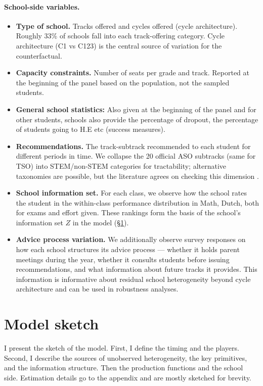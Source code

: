 \documentclass{article}
\begin{document}
\paragraph{School-side variables.}
\begin{itemize}
  \item \textbf{Type of school.} Tracks offered and cycles offered (cycle architecture). Roughly 33\% of schools fall into each track-offering category. Cycle architecture (C1 vs C123) is the central source of variation for the counterfactual.
  \item \textbf{Capacity constraints.} Number of seats per grade and track. Reported at the beginning of the panel based on the population, not the sampled students.
  \item \textbf{General school statistics:} Also given at the beginning of the panel and for other students, schools also provide the percentage of dropout, the percentage of students going to H.E etc (success measures).
  \item \textbf{Recommendations.} The track-subtrack recommended to each student for different periods in time. We collapse the 20 official ASO subtracks (same for TSO) into STEM/non-STEM categories for tractability; alternative taxonomies are possible, but the literature agrees on checking this dimension \citep{arcidiacono2025college, humphries_joensen_veramendi_2025_complementarities}.
  \item \textbf{School information set.} For each class, we observe how the school rates the student in the within-class performance distribution in Math, Dutch, both for exams and effort given. These rankings form the basis of the school's information set $Z$ in the model (\S\ref{sec:model_sketch}).
  \item \textbf{Advice process variation.} We additionally observe survey responses on how each school structures its advice process --- whether it holds parent meetings during the year, whether it consults students before issuing recommendations, and what information about future tracks it provides. This information is informative about residual school heterogeneity beyond cycle architecture and can be used in robustness analyses.
\end{itemize}

\section{Model sketch}
\label{sec:model_sketch}

I present the sketch of the model. First, I define the timing and the players. Second, I describe the sources of unobserved heterogeneity, the key primitives, and the information structure. Then the production functions and the school side. Estimation details go to the appendix and are mostly sketched for brevity.
 
\end{document}
